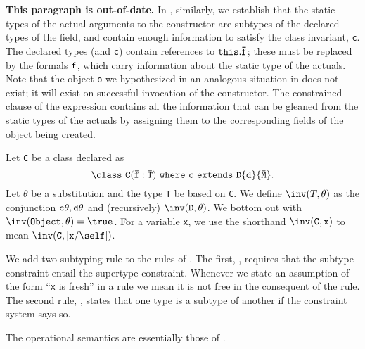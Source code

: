 \textbf{This paragraph is out-of-date.}
In \TNew, similarly, we establish that the static types of the actual
arguments to the constructor are subtypes of the declared types of the
field, and contain enough information to satisfy the class invariant,
{\tt c}. The declared types (and {\tt c}) contain references to ${\tt
this.\bar{\tt f}}$; these must be replaced by the formals $\bar{\tt
f}$, which carry information about the static type of the
actuals. Note that the object {\tt o} we hypothesized in an analogous
situation in \TInvk{} does not exist; it will exist on successful
invocation of the constructor. The constrained clause of the \new{}
expression contains all the information that can be gleaned from the
static types of the actuals by assigning them to the corresponding
fields of the object being created.

Let {\tt C} be a class declared as
$${\tt \class\ C(\TY{\bar{\tt T}}{\bar{\tt f}})\ {\tt where}~c~extends\
D\{d\}\{\bar{\tt M}\}}.$$
Let
$\theta$ be a substitution and the type {\tt T} be based on {\tt C}.
We define $\inv(T,\theta)$
as the conjunction ${\tt c\theta,d\theta}$ and (recursively)
$\inv({\tt D},\theta)$.  We bottom out with $\inv({\tt
Object},\theta)=\true$. For a variable {\tt x}, we use the shorthand
$\inv({\tt C},{\tt x})$ to mean $\inv({\tt C},[{\tt x}/\self])$.

We add two subtyping rule to the rules of \FJ{}.
The first, \SDep, requires
that the subtype constraint entail the supertype constraint.
Whenever we state an assumption of the form ``{\tt x} is
fresh'' in a rule we mean it is not free in the consequent of the
rule.
The second rule, \SC, states that one type is a subtype of another if
the constraint system says so.

The operational semantics are essentially those of \FJ{}.

